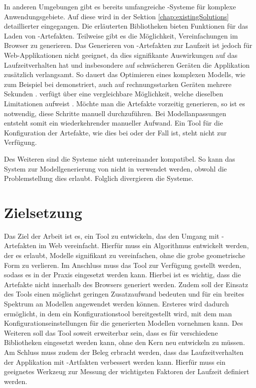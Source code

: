 In anderen Umgebungen gibt es bereits umfangreiche -Systeme für komplexe Anwendungsgebiete. Auf diese wird in der Sektion \autoref{chap:existingSolutions} detaillierter eingegangen.
Die erläuterten Bibliotheken bieten Funktionen für das Laden von -Artefakten. Teilweise gibt es die Möglichkeit, Vereinfachungen im Browser zu generieren. Das Generieren von -Artefakten zur Laufzeit ist jedoch für Web-Applikationen nicht geeignet, da dies signifikante Auswirkungen auf das Laufzeitverhalten hat und insbesondere auf schwächeren Geräten die Applikation zusätzlich verlangsamt.
So dauert das Optimieren eines komplexen Modells, wie zum Beispiel bei  demonstriert, auch auf rechnungsstarken Geräten mehrere Sekunden \cite{babylonAutoLod}.  verfügt über eine vergleichbare Möglichkeit, welche dieselben Limitationen aufweist \cite{threeSimplifyModifier}. Möchte man die Artefakte vorzeitig generieren, so ist es notwendig, diese Schritte manuell durchzuführen. Bei Modellanpassungen entsteht somit ein wiederkehrender manueller Aufwand. Ein Tool für die Konfiguration der Artefakte, wie dies bei  oder  der Fall ist, steht nicht zur Verfügung.

Des Weiteren sind die Systeme nicht untereinander kompatibel. So kann das System zur Modellgenerierung von  nicht in  verwendet werden, obwohl die Problemstellung dies erlaubt. Folglich divergieren die Systeme.

\section{Zielsetzung}
Das Ziel der Arbeit ist es, ein Tool zu entwickeln, das den Umgang mit -Artefakten im Web vereinfacht. Hierfür muss ein Algorithmus entwickelt werden, der es erlaubt, Modelle signifikant zu vereinfachen, ohne die grobe geometrische Form zu verlieren. Im Anschluss muss das Tool zur Verfügung gestellt werden, sodass es in der Praxis eingesetzt werden kann. Hierbei ist es wichtig, dass die Artefakte nicht innerhalb des Browsers generiert werden. Zudem soll der Einsatz des Tools einen möglichst geringen Zusatzaufwand bedeuten und für ein breites Spektrum an Modellen angewendet werden können. Ersteres wird dadurch ermöglicht, in dem ein Konfigurationstool bereitgestellt wird, mit dem man Konfigurationseinstellungen für die generierten Modellen vornehmen kann. Des Weiteren soll das Tool soweit erweiterbar sein, dass es für verschiedene Bibliotheken eingesetzt werden kann, ohne den Kern neu entwickeln zu müssen. Am Schluss muss zudem der Beleg erbracht werden, dass das Laufzeitverhalten der Applikation mit -Artfakten verbessert werden kann. Hierfür muss ein geeignetes Werkzeug zur Messung der wichtigsten Faktoren der Laufzeit definiert werden.
